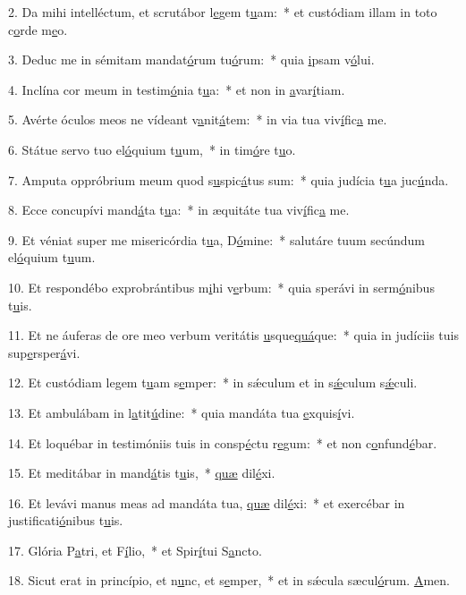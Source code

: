 2. Da mihi intelléctum, et scrutábor l\uline{e}gem t\uline{u}am:~* et custódiam illam in toto c\uline{o}rde m\uline{e}o.\par 
3. Deduc me in sémitam mandat\uline{ó}rum tu\uline{ó}rum:~* quia \uline{i}psam v\uline{ó}lui.\par 
4. Inclína cor meum in testim\uline{ó}nia t\uline{u}a:~* et non in \uline{a}var\uline{í}tiam.\par 
5. Avérte óculos meos ne vídeant v\uline{a}nit\uline{á}tem:~* in via tua viv\uline{í}fic\uline{a} me.\par 
6. Státue servo tuo el\uline{ó}quium t\uline{u}um,~* in tim\uline{ó}re t\uline{u}o.\par 
7. Amputa oppróbrium meum quod s\uline{u}spic\uline{á}tus sum:~* quia judícia t\uline{u}a juc\uline{ú}nda.\par 
8. Ecce concupívi mand\uline{á}ta t\uline{u}a:~* in æquitáte tua viv\uline{í}fic\uline{a} me.\par 
9. Et véniat super me misericórdia t\uline{u}a, D\uline{ó}mine:~* salutáre tuum secúndum el\uline{ó}quium t\uline{u}um.\par 
10. Et respondébo exprobrántibus m\uline{i}hi v\uline{e}rbum:~* quia sperávi in serm\uline{ó}nibus t\uline{u}is.\par 
11. Et ne áuferas de ore meo verbum veritátis \uline{u}sque\uline{quá}que:~* quia in judíciis tuis sup\uline{e}rsper\uline{á}vi.\par 
12. Et custódiam legem t\uline{u}am s\uline{e}mper:~* in sǽculum et in s\uline{ǽ}culum s\uline{ǽ}culi.\par 
13. Et ambulábam in l\uline{a}tit\uline{ú}dine:~* quia mandáta tua \uline{e}xquis\uline{í}vi.\par 
14. Et loquébar in testimóniis tuis in consp\uline{é}ctu r\uline{e}gum:~* et non c\uline{o}nfund\uline{é}bar.\par 
15. Et meditábar in mand\uline{á}tis t\uline{u}is,~* \uline{quæ} dil\uline{é}xi.\par 
16. Et levávi manus meas ad mandáta tua, \uline{quæ} dil\uline{é}xi:~* et exercébar in justificati\uline{ó}nibus t\uline{u}is.\par 
17. Glória P\uline{a}tri, et F\uline{í}lio,~* et Spir\uline{í}tui S\uline{a}ncto.\par 
18. Sicut erat in princípio, et n\uline{u}nc, et s\uline{e}mper,~* et in sǽcula sæcul\uline{ó}rum. \uline{A}men.\par 
